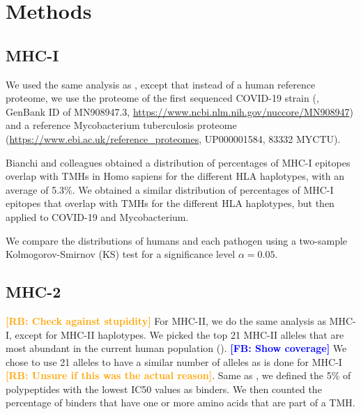 \documentclass{article}
\newcommand{\frans}[1]{\textcolor{blue}{\textbf{[FB: #1]}}}
\newcommand{\richel}[1]{\textcolor{orange}{\textbf{[RB: #1]}}}
\begin{document}
\section{Methods}

\subsection{MHC-I}

We used the same analysis as \cite{bianchi2017},
except that instead of a human reference proteome,
we use the proteome of the first sequenced COVID-19 strain (\cite{wu2020new},
GenBank ID of MN908947.3, \url{https://www.ncbi.nlm.nih.gov/nuccore/MN908947})
and a reference Mycobacterium tuberculosis 
proteome (\url{https://www.ebi.ac.uk/reference_proteomes}, UP000001584, 
83332 MYCTU).

Bianchi and colleagues obtained a distribution of 
percentages of MHC-I epitopes overlap with TMHs in Homo sapiens
for the different HLA haplotypes, with an average of 5.3\%.
We obtained a similar distribution of percentages of MHC-I epitopes that 
overlap with TMHs for the different HLA haplotypes, but then applied to
COVID-19 and Mycobacterium.

We compare the distributions of humans and each pathogen
using a two-sample Kolmogorov-Smirnov (KS) test
for a significance level $\alpha = 0.05$.

\subsection{MHC-2}

\richel{Check against stupidity}
For MHC-II, we do the same analysis as MHC-I, except for
MHC-II haplotypes. We picked the top 21 MHC-II alleles that are most abundant 
in the current human population (\cite{greenbaum2011functional}).
\frans{Show coverage}
We chose to use 21 alleles to have a similar number of alleles as is done
for MHC-I \richel{Unsure if this was the actual reason}.
Same as \cite{bianchi2017}, we defined the 5\% of polypeptides 
with the lowest IC50 values as binders. We then counted the percentage
of binders that have one or more amino acids that are part of a TMH.
\end{document}
